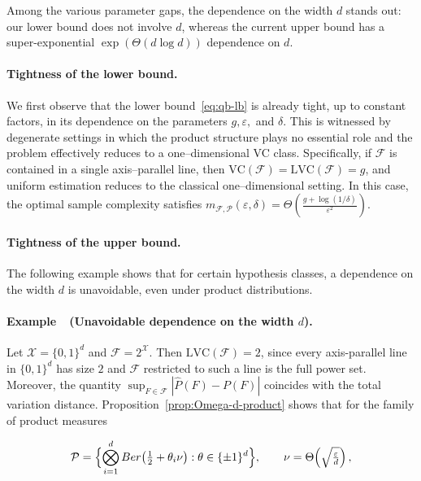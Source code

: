 \documentclass[arxiv]{colt2026}
\newcounter{examplectr}
\newcommand{\X}{\mathcal{X}}
\newcommand{\F}{\mathcal{F}}
\newcommand{\Pc}{\mathcal{P}}
\newcommand{\Ber}{Ber}
\newcommand{\eps}{\varepsilon}
\newcommand{\VC}{\mathrm{VC}}
\newcommand{\LVC}{\mathrm{LVC}}
\begin{document}
\vspace{-0.5em}
Among the various parameter gaps, the dependence on the width $d$ stands out:
our lower bound does not involve $d$, whereas the current upper bound has a
super-exponential $\exp(\Theta(d\log d))$ dependence on $d$.

\vspace{-0.3em}
\paragraph{Tightness of the lower bound.}
We first observe that the lower bound~\eqref{eq:qb-lb} is already tight, up to
constant factors, in its dependence on the parameters $g,\varepsilon,$ and
$\delta$.
This is witnessed by degenerate settings in which the product structure plays no
essential role and the problem effectively reduces to a one--dimensional VC
class.
Specifically, if $\F$ is contained in a single axis--parallel line, then
$\VC(\F)=\LVC(\F)=g$, and uniform estimation reduces to the classical
one--dimensional setting.
In this case, the optimal sample complexity satisfies
$m_{\F,\Pc}(\eps,\delta)=\Theta\!\left(\frac{g+\log(1/\delta)}{\eps^2}\right).$

\vspace{-0.3em}
{\paragraph{Tightness of the upper bound.}
The following example shows that for certain hypothesis classes, a dependence on
the width $d$ is unavoidable, even under product
distributions.}

\paragraph{Example~\theexamplectr\ (Unavoidable dependence on the width $d$).}
\label{ex:d-dependence}
Let $\X=\{0,1\}^d$ and $\F=2^{\X}$.
Then $\LVC(\F)=2$, since every axis-parallel line in $\{0,1\}^d$ has size $2$ and
$\F$ restricted to such a line is the full power set.
Moreover, the quantity $\sup_{F\in\F}|\widehat P(F)-P(F)|$
coincides with the total variation distance.
Proposition~\ref{prop:Omega-d-product} shows that for the family of product
measures

\vspace{-0.5em}
\[
\Pc
=\Bigl\{\bigotimes_{i=1}^d \Ber\!\left(\tfrac12+\theta_i\nu\right)
:\theta\in\{\pm1\}^d\Bigr\},
\qquad
\nu = \Theta\!\left(\sqrt{\tfrac{\eps}{d}}\right),
\]
\end{document}
